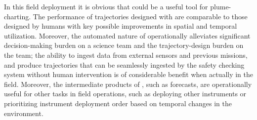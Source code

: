In this field deployment it is obvious that \PHORTEX could be a useful tool for plume-charting. The performance of trajectories designed with \PHORTEX are comparable to those designed by humans with key possible improvements in spatial and temporal utilization. Moreover, the automated nature of \PHORTEX operationally alleviates significant decision-making burden on a science team and the trajectory-design burden on the \Sentry team; the ability to ingest data from external sensors and previous \Sentry missions, and produce trajectories that can be seamlessly ingested by the safety checking system without human intervention is of considerable benefit when actually in the field. Moreover, the intermediate products of \PHORTEX, such as \PHUMES forecasts, are operationally useful for other tasks in field operations, such as deploying other instruments or prioritizing instrument deployment order based on temporal changes in the environment. 

